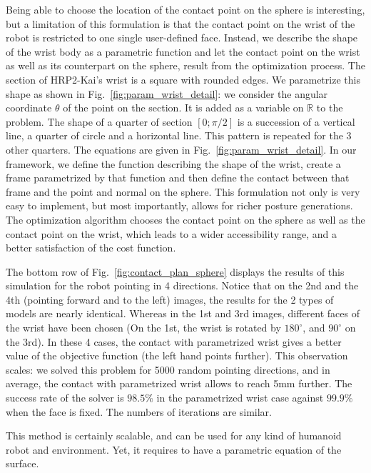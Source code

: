 Being able to choose the location of the contact point on the sphere is interesting, but a limitation of this formulation is that the contact point on the wrist of the robot is restricted to one single user-defined face.
Instead, we describe the shape of the wrist body as a parametric function and let the contact point on the wrist as well as its counterpart on the sphere, result from the optimization process.
The section of HRP2-Kai's wrist is a square with rounded edges.
We parametrize this shape as shown in Fig.~\ref{fig:param_wrist_detail}:
we consider the angular coordinate $\theta$ of the point on the section.
It is added as a variable on $\mathbb{R}$ to the problem.
The shape of a quarter of section $[0;\pi/2]$ is a succession of a vertical line, a quarter of circle and a horizontal line.
This pattern is repeated for the 3 other quarters.
The equations are given in Fig.~\ref{fig:param_wrist_detail}.
In our framework, we define the function describing the shape of the wrist, create a frame parametrized by that function and then define the contact between that frame and the point and normal on the sphere.
This formulation not only is very easy to implement, but most importantly, allows for richer posture generations.
The optimization algorithm chooses the contact point on the sphere as well as the contact point on the wrist, which leads to a wider accessibility range, and a better satisfaction of the cost function.

The bottom row of Fig.~\ref{fig:contact_plan_sphere} displays the results of this simulation for the robot pointing in 4 directions.
Notice that on the 2nd and the 4th (pointing forward and to the left) images, the results for the 2 types of models are nearly identical.
Whereas in the 1st and 3rd images, different faces of the wrist have been chosen (On the 1st, the wrist is rotated by $180^{\circ}$, and $90^{\circ}$ on the 3rd).
In these 4 cases, the contact with parametrized wrist gives a better value of the objective function (the left hand points further).
This observation scales:
we solved this problem for 5000 random pointing directions, and in average, the contact with parametrized wrist allows to reach 5mm further.
The success rate of the solver is $98.5\%$ in the parametrized wrist case against $99.9\%$ when the face is fixed.
The numbers of iterations are similar.

This method is certainly scalable, and can be used for any kind of humanoid robot and environment.
Yet, it requires to have a parametric equation of the surface.

